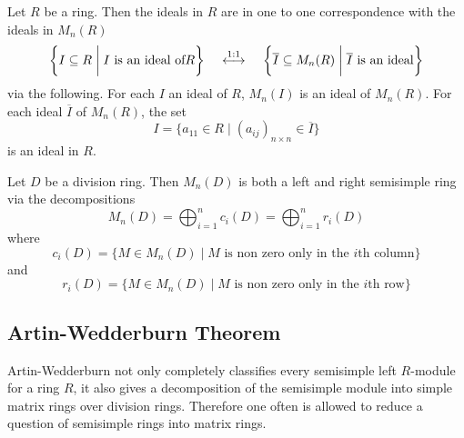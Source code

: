 \documentclass[a4paper]{article}
\begin{document}
\begin{prp}{}{} Let $R$ be a ring. Then the ideals in $R$ are in one to one correspondence with the ideals in $M_n(R)$ $$\left\{I\subseteq R\;\bigg{|}\;I\text{ is an ideal of} R\right\}\;\;\;\;\overset{1:1}{\longleftrightarrow}\;\;\;\;\left\{\overline{I}\subseteq M_n(R)\;\bigg{|}\;\overline{I}\text{ is an ideal}\right\}$$ via the following. For each $I$ an ideal of $R$, $M_n(I)$ is an ideal of $M_n(R)$. For each ideal $\overline{I}$ of $M_n(R)$, the set $$I=\{a_{11}\in R\;|\;(a_{ij})_{n\times  n}\in\overline{I}\}$$ is an ideal in $R$. 
\end{prp}

\begin{prp}{}{} Let $D$ be a division ring. Then $M_n(D)$ is both a left and right semisimple ring via the decompositions $$M_n(D)=\bigoplus_{i=1}^nc_i(D)=\bigoplus_{i=1}^nr_i(D)$$ where $$c_i(D)=\{M\in M_n(D)\;|\;M\text{ is non zero only in the }i\text{th column}\}$$ and $$r_i(D)=\{M\in M_n(D)\;|\;M\text{ is non zero only in the }i\text{th row}\}$$
\end{prp}

\subsection{Artin-Wedderburn Theorem}
Artin-Wedderburn not only completely classifies every semisimple left $R$-module for a ring $R$, it also gives a decomposition of the semisimple module into simple matrix rings over division rings. Therefore one often is allowed to reduce a question of semisimple rings into matrix rings. 
\end{document}
